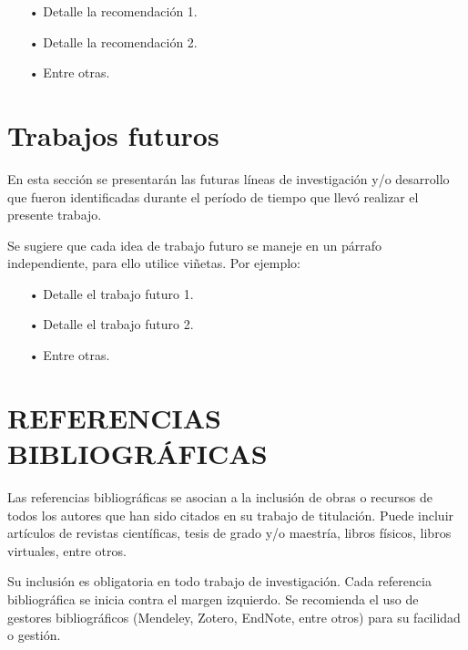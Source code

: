 \documentclass[12pt, a4paper, nofontenc, numbers=endperiod]{apa7}
\begin{document}
{	\newpage
	\restoregeometry
	
	{\doublespacing
		\begin{itemize}	[leftmargin=1.70cm]
			\item[•]	Detalle la recomendación 1.
			\item[•]	Detalle la recomendación 2.
			\item[•]	Entre otras.
		\end{itemize}
	}		
	
	
	\section{\normalsize \centering Trabajos futuros}
	
	\setlength{\parindent}{1.27cm}En esta sección se presentarán las futuras líneas de investigación y/o desarrollo que fueron identificadas durante el período de tiempo que llevó realizar el presente trabajo.
	
	\setlength{\parindent}{1.27cm}Se sugiere que cada idea de trabajo futuro se maneje en un párrafo independiente, para ello utilice viñetas. Por ejemplo:
	{\doublespacing
		\begin{itemize}[leftmargin=1.70cm]
			\item[•]	Detalle el trabajo futuro 1.
			\item[•]	Detalle el trabajo futuro 2.
			\item[•]	Entre otras.
		\end{itemize}
	}	
	
	\newpage

\section*{\large \centering  REFERENCIAS BIBLIOGRÁFICAS}

\setlength{\parindent}{1.27cm}Las referencias bibliográficas se asocian a la inclusión de obras o recursos de todos los autores que han sido citados en su trabajo de titulación. Puede incluir artículos de revistas científicas, tesis de grado y/o maestría, libros físicos, libros virtuales, entre otros.

\setlength{\parindent}{1.27cm}Su inclusión es obligatoria en todo trabajo de investigación. Cada referencia bibliográfica se inicia contra el margen izquierdo. Se recomienda el uso de gestores bibliográficos (Mendeley, Zotero, EndNote, entre otros) para su facilidad o gestión.

}
\end{document}
